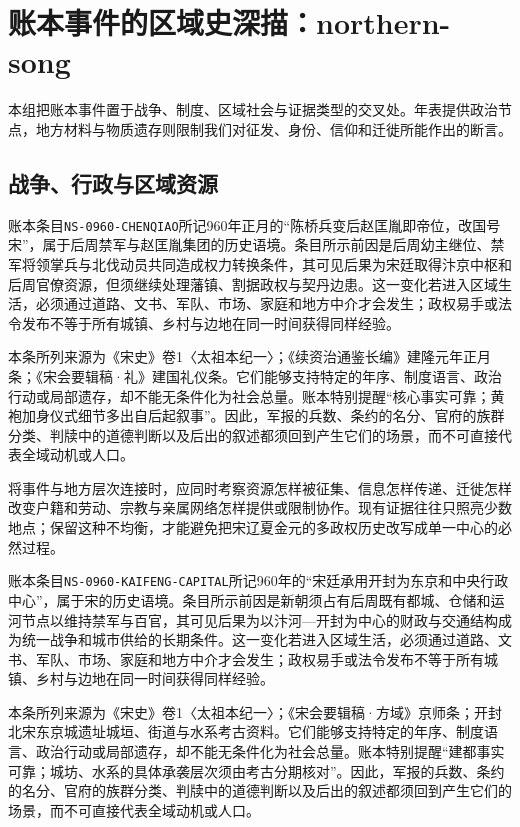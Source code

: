 \section{账本事件的区域史深描：northern-song}

\label{sec:ledger-depth-northern-song}

本组把账本事件置于战争、制度、区域社会与证据类型的交叉处。年表提供政治节点，地方材料与物质遗存则限制我们对征发、身份、信仰和迁徙所能作出的断言。

\subsection{战争、行政与区域资源}

账本条目\texttt{NS-0960-CHENQIAO}所记960年正月的“陈桥兵变后赵匡胤即帝位，改国号宋”，属于后周禁军与赵匡胤集团的历史语境。条目所示前因是后周幼主继位、禁军将领掌兵与北伐动员共同造成权力转换条件，其可见后果为宋廷取得汴京中枢和后周官僚资源，但须继续处理藩镇、割据政权与契丹边患。这一变化若进入区域生活，必须通过道路、文书、军队、市场、家庭和地方中介才会发生；政权易手或法令发布不等于所有城镇、乡村与边地在同一时间获得同样经验。

本条所列来源为《宋史》卷1〈太祖本纪一〉；《续资治通鉴长编》建隆元年正月条；《宋会要辑稿·礼》建国礼仪条。它们能够支持特定的年序、制度语言、政治行动或局部遗存，却不能无条件化为社会总量。账本特别提醒“核心事实可靠；黄袍加身仪式细节多出自后起叙事”。因此，军报的兵数、条约的名分、官府的族群分类、判牍中的道德判断以及后出的叙述都须回到产生它们的场景，而不可直接代表全域动机或人口。

将事件与地方层次连接时，应同时考察资源怎样被征集、信息怎样传递、迁徙怎样改变户籍和劳动、宗教与亲属网络怎样提供或限制协作。现有证据往往只照亮少数地点；保留这种不均衡，才能避免把宋辽夏金元的多政权历史改写成单一中心的必然过程。

账本条目\texttt{NS-0960-KAIFENG-CAPITAL}所记960年的“宋廷承用开封为东京和中央行政中心”，属于宋的历史语境。条目所示前因是新朝须占有后周既有都城、仓储和运河节点以维持禁军与百官，其可见后果为以汴河—开封为中心的财政与交通结构成为统一战争和城市供给的长期条件。这一变化若进入区域生活，必须通过道路、文书、军队、市场、家庭和地方中介才会发生；政权易手或法令发布不等于所有城镇、乡村与边地在同一时间获得同样经验。

本条所列来源为《宋史》卷1〈太祖本纪一〉；《宋会要辑稿·方域》京师条；开封北宋东京城遗址城垣、街道与水系考古资料。它们能够支持特定的年序、制度语言、政治行动或局部遗存，却不能无条件化为社会总量。账本特别提醒“建都事实可靠；城坊、水系的具体承袭层次须由考古分期核对”。因此，军报的兵数、条约的名分、官府的族群分类、判牍中的道德判断以及后出的叙述都须回到产生它们的场景，而不可直接代表全域动机或人口。

